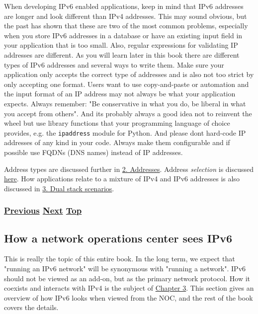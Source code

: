 \documentclass[
]{article}
\begin{document}
When developing IPv6 enabled applications, keep in mind that IPv6
addresses are longer and look different than IPv4 addresses. This may
sound obvious, but the past has shown that these are two of the most
common problems, especially when you store IPv6 addresses in a database
or have an existing input field in your application that is too small.
Also, regular expressions for validating IP addresses are different. As
you will learn later in this book there are different types of IPv6
addresses and several ways to write them. Make sure your application
only accepts the correct type of addresses and is also not too strict by
only accepting one format. Users want to use copy-and-paste or
automation and the input format of an IP address may not always be what
your application expects. Always remember: "Be conservative in what you
do, be liberal in what you accept from others". And it\textquotesingle s
probably always a good idea not to reinvent the wheel but use library
functions that your programming language of choice provides, e.g. the
\texttt{ipaddress} module for Python. And please don\textquotesingle t
hard-code IP addresses of any kind in your code. Always make them
configurable and if possible use FQDNs (DNS names) instead of IP
addresses.

Address types are discussed further in \hyperref[addresses]{2.
Addresses}. Address \emph{selection} is discussed
\hyperref[source-and-destination-address-selection]{here}. How
applications relate to a mixture of IPv4 and IPv6 addresses is also
discussed in \hyperref[dual-stack-scenarios]{3. Dual stack scenarios}.

\subsubsection{\texorpdfstring{\hyperref[how-a-user-sees-ipv6]{Previous}
\hyperref[how-a-network-operations-center-sees-ipv6]{Next}
\hyperref[introduction-and-foreword]{Top}}{Previous Next Top}}\label{previous-next-top-2}

\pagebreak

\subsection{How a network operations center sees
IPv6}\label{how-a-network-operations-center-sees-ipv6}

This is really the topic of this entire book. In the long term, we
expect that "running an IPv6 network" will be synonymous with "running a
network". IPv6 should not be viewed as an add-on, but as the primary
network protocol. How it coexists and interacts with IPv4 is the subject
of
\href{https://github.com/becarpenter/book6/tree/main/3.\%20Coexistence\%20with\%20legacy\%20IPv4}{Chapter
3}. This section gives an overview of how IPv6 looks when viewed from
the NOC, and the rest of the book covers the details.
\end{document}
